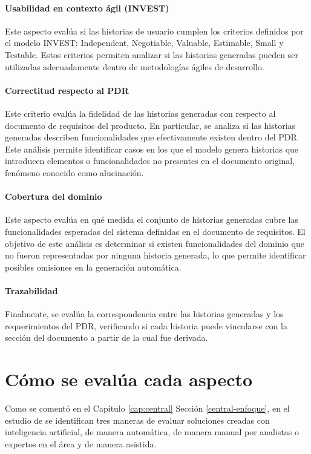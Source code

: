 \paragraph{Usabilidad en contexto ágil (INVEST)}
Este aspecto evalúa si las historias de usuario cumplen los criterios definidos por el modelo INVEST: Independent, Negotiable, Valuable, Estimable, Small y Testable. Estos criterios permiten analizar si las historias generadas pueden ser utilizadas adecuadamente dentro de metodologías ágiles de desarrollo.
\paragraph{Correctitud respecto al PDR}
Este criterio evalúa la fidelidad de las historias generadas con respecto al documento de requisitos del producto. En particular, se analiza si las historias generadas describen funcionalidades que efectivamente existen dentro del PDR. Este análisis permite identificar casos en los que el modelo genera historias que introducen elementos o funcionalidades no presentes en el documento original, fenómeno conocido como alucinación.
\paragraph{Cobertura del dominio}
Este aspecto evalúa en qué medida el conjunto de historias generadas cubre las funcionalidades esperadas del sistema definidas en el documento de requisitos. El objetivo de este análisis es determinar si existen funcionalidades del dominio que no fueron representadas por ninguna historia generada, lo que permite identificar posibles omisiones en la generación automática.
\paragraph{Trazabilidad}
Finalmente, se evalúa la correspondencia entre las historias generadas y los requerimientos del PDR, verificando si cada historia puede vincularse con la sección del documento a partir de la cual fue derivada.

\section{Cómo se evalúa cada aspecto}
Como se comentó en el Capítulo \ref{cap:central} Sección \ref{central-enfoque}, en el estudio de \cite{yu2026evaluating_genai_quality_multicase} se identifican tres maneras de evaluar soluciones creadas con inteligencia artificial, de manera automática, de manera manual por analistas o expertos en el área y de manera asistida.

